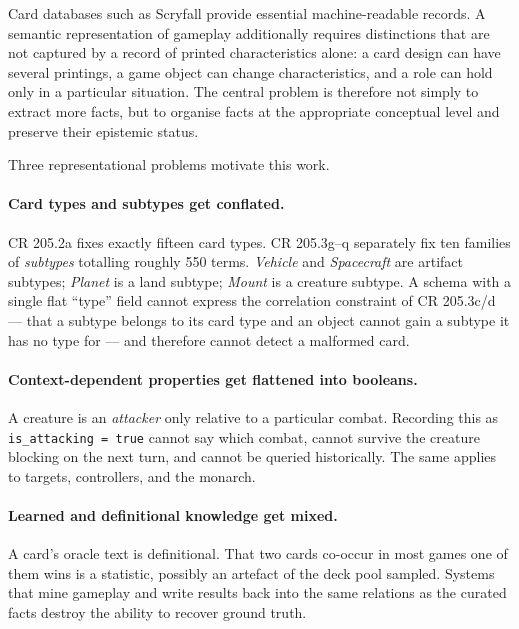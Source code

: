 \documentclass[11pt,a4paper]{article}
\begin{document}
Card databases such as Scryfall provide essential machine-readable records. A semantic representation of gameplay additionally requires distinctions that are not captured by a record of printed characteristics alone: a card design can have several printings, a game object can change characteristics, and a role can hold only in a particular situation. The central problem is therefore not simply to extract more facts, but to organise facts at the appropriate conceptual level and preserve their epistemic status.

Three representational problems motivate this work.

\paragraph{Card types and subtypes get conflated.} CR 205.2a fixes exactly fifteen card types. CR 205.3g--q separately fix ten families of \emph{subtypes} totalling roughly 550 terms. \emph{Vehicle} and \emph{Spacecraft} are artifact subtypes; \emph{Planet} is a land subtype; \emph{Mount} is a creature subtype. A schema with a single flat ``type'' field cannot express the correlation constraint of CR 205.3c/d --- that a subtype belongs to its card type and an object cannot gain a subtype it has no type for --- and therefore cannot detect a malformed card.

\paragraph{Context-dependent properties get flattened into booleans.} A creature is an \emph{attacker} only relative to a particular combat. Recording this as \texttt{is\_attacking = true} cannot say which combat, cannot survive the creature blocking on the next turn, and cannot be queried historically. The same applies to targets, controllers, and the monarch.

\paragraph{Learned and definitional knowledge get mixed.} A card's oracle text is definitional. That two cards co-occur in most games one of them wins is a statistic, possibly an artefact of the deck pool sampled. Systems that mine gameplay and write results back into the same relations as the curated facts destroy the ability to recover ground truth.
\end{document}
